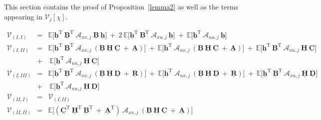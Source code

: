\documentclass[letterpaper,11pt]{article}
\newcommand{\T}{\mathrm{T}}
\begin{document}
This section contains the proof of Proposition~\ref{lemma2}
as well as  the terms appearing 
in $ \mathcal{V}_j[ \chi] $.

\begin{eqnarray*}
	\mathcal{V}_{(I,I)} & = & \mathbb{E}\bigg[\underline{\mathbf{h}}^\T ~ \underline{\mathbf{B}}^\T ~ \mathcal{A}_{xx,j}~ 
	\underline{\mathbf{B}}~ \underline{\mathbf{h}}\bigg] ~+~ 2 ~ \mathbb{E}\bigg[ \underline{\mathbf{h}}^\T ~ \underline{\mathbf{B}}^\T ~ 
	\mathcal{A}_{xu,j}~  \underline{\mathbf{h}}\bigg] 
	~ + ~ \mathbb{E}\bigg[ \underline{\mathbf{h}}^\T ~ \mathcal{A}_{uu,j} ~  \underline{\mathbf{h}} \bigg]\\
	\mathcal{V}_{(I,II)}  & = & \mathbb{E}\bigg[\underline{\mathbf{h}}^\T ~ \underline{\mathbf{B}}^\T ~ \mathcal{A}_{xx,j}~ 
	(	\underline{\mathbf{B}}~ \underline{\mathbf{H}}~ \underline{\mathbf{C}}~ + ~ \underline{\mathbf{A}} )\bigg] ~+~
	\mathbb{E}\bigg[\underline{\mathbf{h}}^\T  ~ \mathcal{A}_{ux,j} ~ 
	(	\underline{\mathbf{B}}~ \underline{\mathbf{H}}~ \underline{\mathbf{C}}~ + ~ \underline{\mathbf{A}} ) \bigg] 
	~+ ~  \mathbb{E}\bigg[\underline{\mathbf{h}}^\T ~\underline{\mathbf{B}}^\T~ \mathcal{A}_{xu,j} ~ \underline{\mathbf{H}}~ \underline{\mathbf{C}}\bigg] \\ ~&+&~
	\mathbb{E}\bigg[ \underline{\mathbf{h}}^\T ~ \mathcal{A}_{uu,j}~\underline{\mathbf{H}}~ \underline{\mathbf{C}}   \bigg]	\\
	\mathcal{V}_{(I,III)}  & = & \mathbb{E}\bigg[\underline{\mathbf{h}}^\T ~ \underline{\mathbf{B}}^\T ~ \mathcal{A}_{xx,j}~ 
	(	\underline{\mathbf{B}}~ \underline{\mathbf{H}}~ \underline{\mathbf{D}}~ + ~ \underline{\mathbf{R}} )\bigg] ~+~ \mathbb{E}\bigg[
	\underline{\mathbf{h}}^\T  ~ \mathcal{A}_{ux,j} ~ 
	(	\underline{\mathbf{B}}~ \underline{\mathbf{H}}~ \underline{\mathbf{D}}~ + ~ \underline{\mathbf{R}} ) \bigg] 
	~+ ~ \mathbb{E}\bigg[ \underline{\mathbf{h}}^\T ~\underline{\mathbf{B}}^\T~ \mathcal{A}_{xu,j} ~ \underline{\mathbf{H}}~ \underline{\mathbf{D}}\bigg]\\ ~&+&~
	\mathbb{E}\bigg[\underline{\mathbf{h}}^\T ~ \mathcal{A}_{uu,j}~\underline{\mathbf{H}}~ \underline{\mathbf{D}}   \bigg]	\\
	\mathcal{V}_{(II,I)}  & = & 	\mathcal{V}_{(I,II)} \\
	\mathcal{V}_{(II,II)}  & = &   \mathbb{E}\bigg[
	(	\underline{\mathbf{C}}^\T~ \underline{\mathbf{H}}^\T~ \underline{\mathbf{B}}^\T~ + ~ \underline{\mathbf{A}}^\T ) ~ \mathcal{A}_{xx,j}~ (	\underline{\mathbf{B}}~ \underline{\mathbf{H}}~ \underline{\mathbf{C}}~ + ~ \underline{\mathbf{A}} ) \bigg]

\end{eqnarray*}
\end{document}
